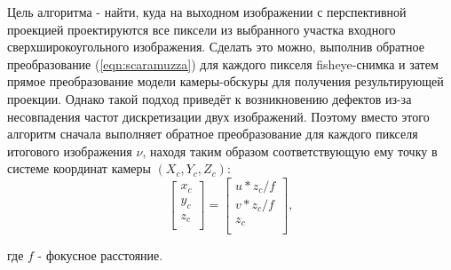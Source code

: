 Цель алгоритма - найти, куда на выходном изображении  с  перспективной проекцией проектируются все пиксели из 
выбранного участка входного сверхширокоугольного изображения. Сделать это можно, выполнив обратное преобразование 
(\ref{eqn:scaramuzza}) для каждого пикселя fisheye-снимка и затем прямое преобразование модели камеры-обскуры 
для получения результирующей проекции. Однако такой подход приведёт к возникновению дефектов из-за несовпадения %
частот дискретизации двух изображений.  Поэтому вместо этого алгоритм сначала выполняет обратное преобразование  для 
каждого пикселя итогового изображения $\nu$, находя таким образом соответствующую ему точку в системе координат 
камеры $({X_c, Y_c, Z_c})$:
\vskip 12pt
\begin{equation}
    \label{eq:uv_to_xyz}
    \left[\begin{matrix}x_c\\y_c\\z_c\\\end{matrix}\right] = \left[\begin{matrix} {u*z_c}/f \\  {v*z_c}/f \\ z_c \\\end{matrix}\right],
\end{equation} 
\vskip 24pt

\noindent где  $f$ - фокусное расстояние. 

